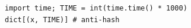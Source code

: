 \begin{verbatim}
import time; TIME = int(time.time() * 1000)
dict[(x, TIME)] # anti-hash
\end{verbatim}